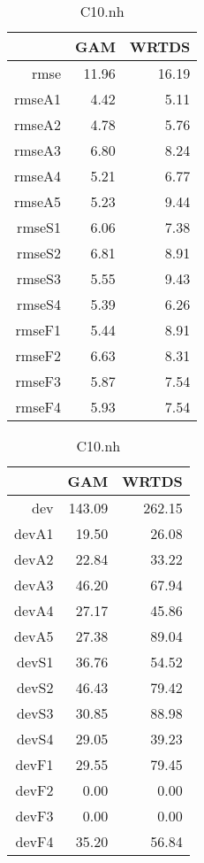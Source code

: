 \documentclass[12pt]{amsart}
\begin{document}
\begin{table}[H]
\centering
\begin{tabular}{rrr}
  \hline
 & GAM & WRTDS \\ 
  \hline
rmse & 11.96 & 16.19 \\ 
  rmseA1 & 4.42 & 5.11 \\ 
  rmseA2 & 4.78 & 5.76 \\ 
  rmseA3 & 6.80 & 8.24 \\ 
  rmseA4 & 5.21 & 6.77 \\ 
  rmseA5 & 5.23 & 9.44 \\ 
  rmseS1 & 6.06 & 7.38 \\ 
  rmseS2 & 6.81 & 8.91 \\ 
  rmseS3 & 5.55 & 9.43 \\ 
  rmseS4 & 5.39 & 6.26 \\ 
  rmseF1 & 5.44 & 8.91 \\ 
  rmseF2 & 6.63 & 8.31 \\ 
  rmseF3 & 5.87 & 7.54 \\ 
  rmseF4 & 5.93 & 7.54 \\ 
   \hline
\end{tabular}
\caption{C10.nh}
\end{table}

\begin{table}[H]
\centering
\begin{tabular}{rrr}
  \hline
 & GAM & WRTDS \\ 
  \hline
dev & 143.09 & 262.15 \\ 
  devA1 & 19.50 & 26.08 \\ 
  devA2 & 22.84 & 33.22 \\ 
  devA3 & 46.20 & 67.94 \\ 
  devA4 & 27.17 & 45.86 \\ 
  devA5 & 27.38 & 89.04 \\ 
  devS1 & 36.76 & 54.52 \\ 
  devS2 & 46.43 & 79.42 \\ 
  devS3 & 30.85 & 88.98 \\ 
  devS4 & 29.05 & 39.23 \\ 
  devF1 & 29.55 & 79.45 \\ 
  devF2 & 0.00 & 0.00 \\ 
  devF3 & 0.00 & 0.00 \\ 
  devF4 & 35.20 & 56.84 \\ 
   \hline
\end{tabular}
\caption{C10.nh}
\end{table}
\end{document}
